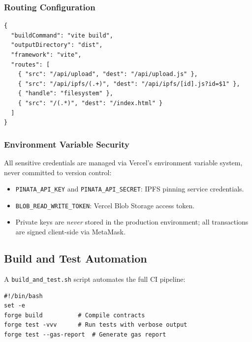 \subsubsection{Routing Configuration}

\begin{lstlisting}[language={}, caption={vercel.json}]
{
  "buildCommand": "vite build",
  "outputDirectory": "dist",
  "framework": "vite",
  "routes": [
    { "src": "/api/upload", "dest": "/api/upload.js" },
    { "src": "/api/ipfs/(.+)", "dest": "/api/ipfs/[id].js?id=$1" },
    { "handle": "filesystem" },
    { "src": "/(.*)", "dest": "/index.html" }
  ]
}
\end{lstlisting}

\subsubsection{Environment Variable Security}

All sensitive credentials are managed via Vercel's environment variable system, never committed to version control:

\begin{itemize}[leftmargin=1.5em]
    \item \texttt{PINATA\_API\_KEY} and \texttt{PINATA\_API\_SECRET}: IPFS pinning service credentials.
    \item \texttt{BLOB\_READ\_WRITE\_TOKEN}: Vercel Blob Storage access token.
    \item Private keys are \emph{never} stored in the production environment; all transactions are signed client-side via MetaMask.
\end{itemize}

\subsection{Build and Test Automation}

A \texttt{build\_and\_test.sh} script automates the full CI pipeline:

\begin{lstlisting}[language={}, caption={CI Script}]
#!/bin/bash
set -e
forge build          # Compile contracts
forge test -vvv      # Run tests with verbose output
forge test --gas-report  # Generate gas report
\end{lstlisting}
